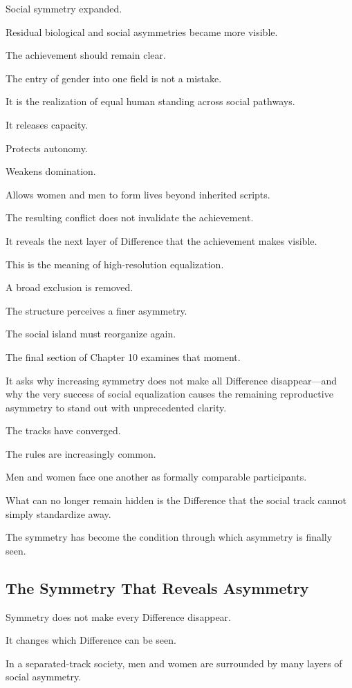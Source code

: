Social symmetry expanded.

Residual biological and social asymmetries became more visible.

The achievement should remain clear.

The entry of gender into one field is not a mistake.

It is the realization of equal human standing across social pathways.

It releases capacity.

Protects autonomy.

Weakens domination.

Allows women and men to form lives beyond inherited scripts.

The resulting conflict does not invalidate the achievement.

It reveals the next layer of Difference that the achievement makes visible.

This is the meaning of high-resolution equalization.

A broad exclusion is removed.

The structure perceives a finer asymmetry.

The social island must reorganize again.

The final section of Chapter 10 examines that moment.

It asks why increasing symmetry does not make all Difference disappear—and why the very success of social equalization causes the remaining reproductive asymmetry to stand out with unprecedented clarity.

The tracks have converged.

The rules are increasingly common.

Men and women face one another as formally comparable participants.

What can no longer remain hidden is the Difference that the social track cannot simply standardize away.

The symmetry has become the condition through which asymmetry is finally seen.

\subsection*{\textbf{The Symmetry That Reveals Asymmetry}}

Symmetry does not make every Difference disappear.

It changes which Difference can be seen.

In a separated-track society, men and women are surrounded by many layers of social asymmetry.

